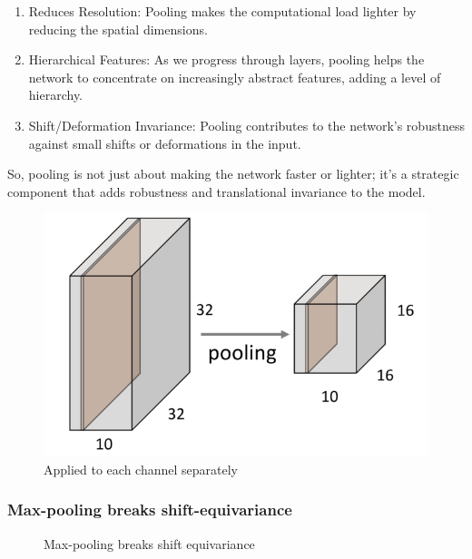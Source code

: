 \documentclass[11pt]{article}
\begin{document}
\begin{enumerate}
    \item Reduces Resolution: Pooling makes the computational load lighter by reducing the     spatial dimensions.
    \item Hierarchical Features: As we progress through layers, pooling helps the network to     concentrate on increasingly abstract features, adding a level of hierarchy.
    \item Shift/Deformation Invariance: Pooling contributes to the network's robustness against    small shifts or deformations in the input.
\end{enumerate}

So, pooling is not just about making the network faster or lighter; it's a strategic component that adds robustness and translational invariance to the model.

\begin{figure}[H]
    \centering
    \includegraphics[width=.6\linewidth]{figures/pooling.png}
    \caption{Applied to each channel separately}
\end{figure}

\subsubsection{Max-pooling breaks shift-equivariance~\cite{youtubeMakingConvolutional}}

\begin{figure}
    \caption{Max-pooling breaks shift equivariance}
\end{figure}
\end{document}
